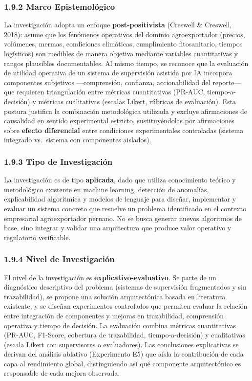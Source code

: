 \subsubsection{1.9.2 Marco
Epistemológico}\label{marco-epistemoluxf3gico}

La investigación adopta un enfoque \textbf{post-positivista} (Creswell
\& Creswell, 2018): asume que los fenómenos operativos del dominio
agroexportador (precios, volúmenes, mermas, condiciones climáticas,
cumplimiento fitosanitario, tiempos logísticos) son medibles de manera
objetiva mediante variables cuantitativas y rangos plausibles
documentables. Al mismo tiempo, se reconoce que la evaluación de
utilidad operativa de un sistema de supervisión asistida por IA
incorpora componentes subjetivos ---comprensión, confianza,
accionabilidad del reporte--- que requieren triangulación entre métricas
cuantitativas (PR-AUC, tiempo-a-decisión) y métricas cualitativas
(escalas Likert, rúbricas de evaluación). Esta postura justifica la
combinación metodológica utilizada y excluye afirmaciones de causalidad
en sentido experimental estricto, sustituyéndolas por afirmaciones sobre
\textbf{efecto diferencial} entre condiciones experimentales controladas
(sistema integrado vs.~sistema con componentes aislados).

\subsubsection{1.9.3 Tipo de
Investigación}\label{tipo-de-investigaciuxf3n}

La investigación es de tipo \textbf{aplicada}, dado que utiliza
conocimiento teórico y metodológico existente en machine learning,
detección de anomalías, explicabilidad algorítmica y modelos de lenguaje
para diseñar, implementar y evaluar un sistema concreto que resuelve un
problema identificado en el contexto empresarial agroexportador peruano.
No se busca generar nuevos algoritmos de base, sino integrar y validar
una arquitectura que produce valor operativo y regulatorio verificable.

\subsubsection{1.9.4 Nivel de
Investigación}\label{nivel-de-investigaciuxf3n}

El nivel de la investigación es \textbf{explicativo-evaluativo}. Se
parte de un diagnóstico descriptivo del problema (sistemas de
supervisión fragmentados y sin trazabilidad), se propone una solución
arquitectónica basada en literatura existente, y se diseñan experimentos
controlados que permiten evaluar la relación entre integración de
componentes y mejoras en trazabilidad, comprensión operativa y tiempo de
decisión. La evaluación combina métricas cuantitativas (PR-AUC,
F1-Score, cobertura de trazabilidad, tiempo-a-decisión) y cualitativas
(escala Likert con supervisores o evaluadores). Las conclusiones
explicativas se derivan del análisis ablativo (Experimento E5) que aísla
la contribución de cada capa al rendimiento global, distinguiendo así
qué componente arquitectónico es responsable de cada mejora observada.

